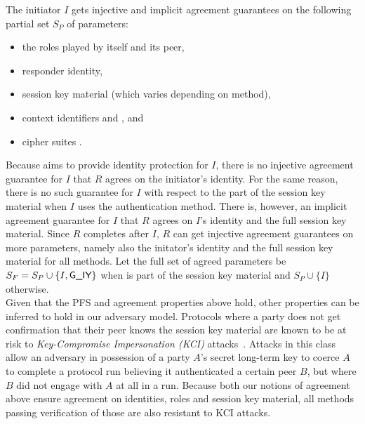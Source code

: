 %

\label{sec:agreedParams}
The initiator $I$ gets injective and implicit agreement guarantees on the
following partial set $S_P$ of parameters:
\begin{itemize}
    \item the roles played by itself and its peer,
    \item responder identity,
    \item session key material (which varies depending on \mEdhoc{} method),
    \item context identifiers \mCi{} and \mCr{}, and
    \item cipher suites \mSuites{}.
\end{itemize}
%
Because \mEdhoc{} aims to provide identity protection for $I$, there is no
injective agreement guarantee for $I$ that $R$ agrees on the initiator's
identity.
%
For the same reason, there is no such guarantee for $I$ with respect to
the \mGiy{} part of the session key material when $I$ uses the \mStat{}
authentication method.
%
There is, however, an implicit agreement guarantee for $I$ that $R$ agrees on
$I$'s identity and the full session key material.
%
Since $R$ completes after $I$, $R$ can get injective agreement guarantees on
more parameters, namely also the initator's identity and the full session key
material for all methods.
%
Let the full set of agreed parameters be $S_F = S_P \cup \{I, \textsf{G\_IY}\}$
when \mGiy{} is
part of the session key material and $S_P \cup \{I\}$ otherwise.\\
%

Given that the PFS and agreement properties
above hold, other properties can be inferred to hold in our adversary model.
%
Protocols where a party does not get confirmation that their peer knows the
session key material are known to be at risk to
\emph{Key-Compromise Impersonation (KCI)}
attacks~\cite{DBLP:conf/ima/Blake-WilsonJM97}.
%
Attacks in this class allow an adversary in possession of a party $A$'s secret
long-term key to coerce $A$ to complete a
protocol run believing it authenticated a certain peer $B$, but where $B$ did
not engage with $A$ at all in a run.
%
Because both our notions of agreement above ensure agreement on identities,
roles and session key material, all methods passing verification of those are
also resistant to KCI attacks.

